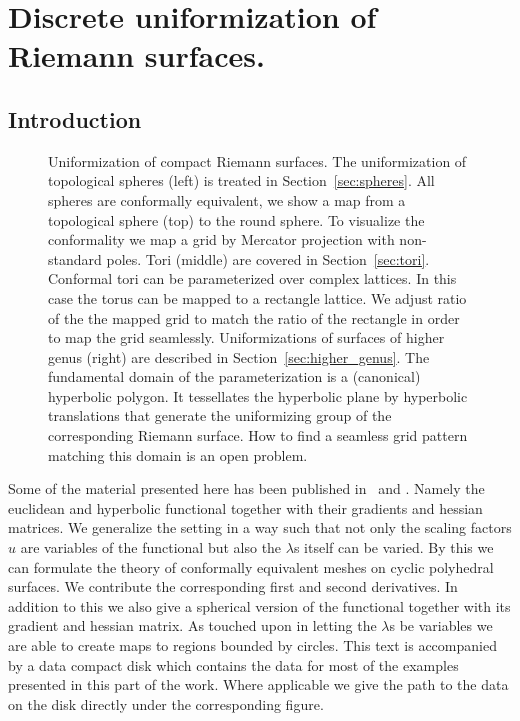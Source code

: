 \documentclass[Thesis]{subfiles}
\begin{document}

\chapter{Discrete uniformization of Riemann surfaces.}
\label{chp:uniformization}

\section{Introduction}

\begin{figure}
\centering
{}
\caption{
Uniformization of compact Riemann surfaces. 
The uniformization of topological spheres (left) is treated in Section~\ref{sec:spheres}.
All spheres are conformally equivalent, we show a map from a topological sphere (top) to the round sphere. 
To visualize the conformality we map a grid by Mercator projection with non-standard poles.
Tori (middle) are covered in Section~\ref{sec:tori}.
Conformal tori can be parameterized over complex lattices. 
In this case the torus can be mapped to a rectangle lattice. 
We adjust ratio of the the mapped grid to match the ratio of the rectangle in order to map the grid seamlessly.
Uniformizations of surfaces of higher genus (right) are described in Section~\ref{sec:higher_genus}.
The fundamental domain of the parameterization is a (canonical) hyperbolic polygon. 
It tessellates the hyperbolic plane by hyperbolic translations that generate the uniformizing group of the corresponding Riemann surface.
How to find a seamless grid pattern matching this domain is an open problem.
}
\label{fig:intro_uniformization}
\end{figure}

Some of the material presented here has been published in~\cite{Bobenko2010} and \cite{Springborn2008}. 
Namely the euclidean and hyperbolic functional together with their gradients and hessian matrices. 
We generalize the setting in a way such that not only the scaling factors $u$ are variables of the functional but also the $\lambda$s itself can be varied. By this we can formulate the theory of conformally equivalent meshes on cyclic polyhedral surfaces.
We contribute the corresponding first and second derivatives. 
In addition to this we also give a spherical version of the functional together with its gradient and hessian matrix. 
As touched upon in \cite{Bobenko2010} letting the $\lambda$s be variables we are able to create maps to regions bounded by circles.
This text is accompanied by a data compact disk which contains the data for most of the examples presented in this part of the work. 
Where applicable we give the path to the data on the disk directly under the corresponding figure.
\end{document}
